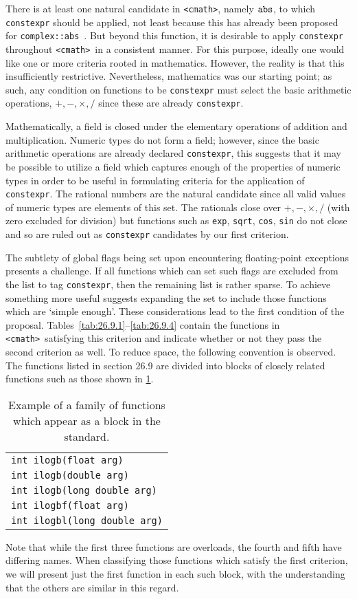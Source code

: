 \documentclass[prd,preprint,amsmath,amssymb,nofootinbib,eqsecnum]{revtex4-1}
\newcommand{\constexpr}{\code{constexpr}\xspace}
\newcommand{\code}[1]{{\tt #1}}
\newcommand{\header}[1]{{\tt <#1>}}
\newcommand{\cmath}{\header{cmath}}
\begin{document}
There is at least one natural candidate in \header{cmath}, namely $\code{abs}$,
to which \constexpr should be applied, not least because this has already been proposed
for \code{complex::abs}~\cite{AP-complex}. But beyond this function, it is desirable to
apply \constexpr throughout \cmath\ in a consistent manner. For this purpose, ideally one would
like one or more criteria rooted in mathematics. However, the reality is that
this insufficiently restrictive. Nevertheless, mathematics was our starting
point; as such, any condition on functions to be \constexpr must select the
basic arithmetic operations, $+,-,\times,/$ since these are already \constexpr.

Mathematically, a field is closed under the elementary operations of addition
and multiplication.
Numeric types do not form a field; however, since the basic arithmetic
operations are already declared \constexpr, this suggests that it may be
possible to utilize a field which captures enough of the properties of numeric
types in order to be useful in formulating criteria for the application of
\constexpr. The rational numbers are the natural candidate since all valid
values of numeric types are elements of this set. The rationals close over
$+,-,\times,/$ (with zero excluded for division)
but functions such as \code{exp}, \code{sqrt}, \code{cos},
\code{sin} do not close and so are ruled out as \constexpr candidates
by our first criterion.

The subtlety of global flags being set upon encountering floating-point
exceptions presents a challenge. If all functions which can set such flags are
excluded from the list to tag \constexpr, then the remaining list is rather
sparse. To achieve something more useful suggests expanding the set to include
those functions which are `simple enough'. These considerations lead to the
first condition of the proposal.
Tables~\ref{tab:26.9.1}--\ref{tab:26.9.4} contain the functions in \cmath\
satisfying this criterion and indicate whether or not they pass the second
criterion as well. To reduce space, the following convention is observed. The
functions listed in section 26.9 are divided into blocks of closely related
functions such as those shown in \ref{tab:example}. 
\begin{table}
	\begin{tabular}{l}
		\code{int ilogb(float arg)}
	\\
		\code{int ilogb(double arg)}
	\\
		\code{int ilogb(long double arg)}
	\\
		\code{int ilogbf(float arg)}
	\\
		\code{int ilogbl(long double arg)}
	\end{tabular}
\caption{Example of a family of functions which appear as a block in the standard.}
\label{tab:example}
\end{table}
Note that while the first three functions are overloads, the fourth and fifth
have differing names.  When classifying those functions which satisfy the first
criterion, we will present just the first function in each such block, with the
understanding that the others are similar in this regard.
\end{document}
